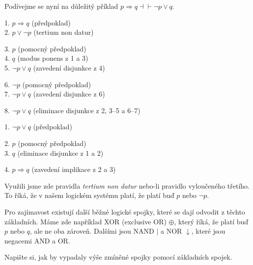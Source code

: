 \begin{example}
  Podívejme se nyní na důležitý příklad $p\Rightarrow q \dashv\vdash \neg p\lor q$. 
  \begin{proofbox}
    1. $p \Rightarrow q$ (předpoklad) \\
    2. $p \lor \neg p$ (tertium non datur) 
    \begin{proofbox}
      3. $p$ (pomocný předpoklad) \\
      4. $q$ (modus ponens z 1 a 3) \\
      5. $\neg p \lor q$ (zavedení disjunkce z 4)
    \end{proofbox}
    \begin{proofbox}
      6. $\neg p$ (pomocný předpoklad) \\
      7. $\neg p \lor q$ (zavedení disjunkce z 6)
    \end{proofbox}
    8. $\neg p \lor q$ (eliminace disjunkce z 2, 3--5 a 6--7)
  \end{proofbox}
  \begin{proofbox}
    1. $\neg p \lor q$ (předpoklad) 
    \begin{proofbox}
      2. $p$ (pomocný předpoklad) \\
      3. $q$ (eliminace disjunkce z 1 a 2) 
    \end{proofbox}
    4. $p \Rightarrow q$ (zavedení implikace z 2 a 3)
  \end{proofbox}
  Využili jsme zde pravidla \textit{tertium non datur} nebo-li pravidlo vyloučeného třetího. To říká, že v našem logickém systému platí, že platí buď $p$ nebo $\neg p$.
\end{example}

\begin{note}
  Pro zajímavost existují další běžné logické spojky, které se dají odvodit z těchto základních. Máme zde například XOR (exclusive OR) $\oplus$, který říká, že platí buď $p$ nebo $q$, ale ne oba zároveň. Dalšími jsou NAND $\mid$ a NOR $\downarrow$, které jsou negacemi AND a OR.\@ 
\end{note}

\begin{problem}
  Napište si, jak by vypadaly výše zmíněné spojky pomocí základních spojek.
\end{problem}

